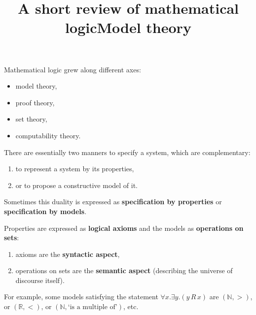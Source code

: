 \documentclass[wide]{slides}
\begin{document}
\begin{slide}
  \title{A short review of mathematical logic}

  Mathematical logic grew along different axes:
  \begin{itemize}

    \item model theory,

    \item proof theory,

    \item set theory,

    \item computability theory.

  \end{itemize}
\end{slide}

\begin{slide}
  \title{Model theory}

  There are essentially two manners to specify a system, which are
  complementary:
  \begin{enumerate}

    \item to represent a system by its properties,

    \item or to propose a constructive model of it.

  \end{enumerate}
  Sometimes this duality is expressed as \textbf{specification by
    properties} or \textbf{specification by models}.

  \medskip

  Properties are expressed as \textbf{logical axioms} and the models
  as \textbf{operations on sets}:
  \begin{enumerate}

    \item axioms are the \textbf{syntactic aspect},

    \item operations on sets are the \textbf{semantic aspect}
      (describing the universe of discourse itself).

  \end{enumerate}
  For example, some models satisfying the statement $\forall x.\exists
  y.(y \, R \, x)$ are $(\mathbb{N},>)$, or $(\mathbb{R},<)$, or
  $(\mathbb{N},\mbox{`is a multiple of'})$, etc.
\end{slide}
\end{document}
